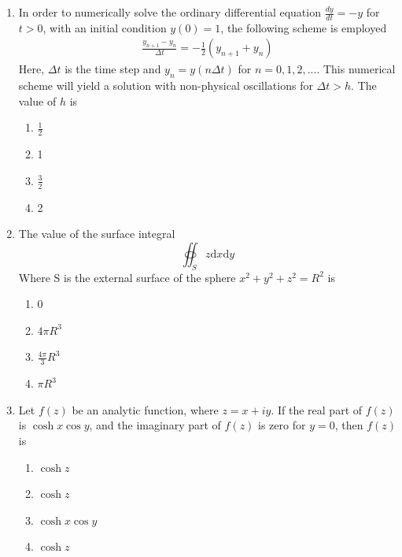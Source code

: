 \documentclass[journal,11pt,onecolumn]{IEEEtran}
\begin{document}
\begin{enumerate}[resume]

    \item In order to numerically solve the ordinary differential equation $\frac{dy}{dt} = -y$ for $t > 0$, with an initial condition $y(0) = 1$, the following scheme is employed
          \begin{align}
              \frac{y_{n+1} - y_n}{\Delta t} = -\frac{1}{2}(y_{n+1}+y_{n})
          \end{align}
          Here, $\Delta t$ is the time step and $y_n = y(n\Delta t)$ for $n = 0, 1, 2, ...$. This numerical scheme will yield a solution with non-physical oscillations for $\Delta t > h$. The value of $h$ is

          \begin{enumerate}
              \item $\frac{1}{2}$
              \item 1
              \item $\frac{3}{2}$
              \item 2
          \end{enumerate}

    \item The value of the surface integral
          \[
              \oiint_{S} z \mathrm{d}x \mathrm{d}y
          \]
          Where S is the external surface of the sphere $x^2 + y^2 + z^2 = R^2$ is

          \begin{enumerate}
              \item 0
              \item $4\pi R^3$
              \item $\frac{4\pi}{3} R^3$
              \item $\pi R^3$
          \end{enumerate}

    \item Let $f(z)$ be an analytic function, where $z = x + iy$. If the real part of $f(z)$ is $\cosh x \cos y$, and the imaginary part of $f(z)$ is zero for $y = 0$, then $f(z)$ is

          \begin{enumerate}
              \item $\cosh z$
              \item $\cosh z$
              \item $\cosh x \cos y$
              \item $\cosh z$
          \end{enumerate}


\end{enumerate}
\end{document}
